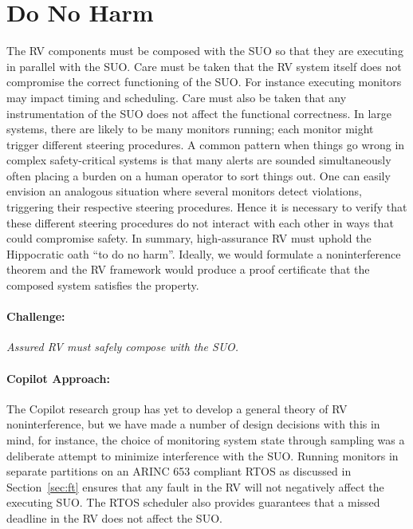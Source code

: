 \section{Do No Harm} \label{sec:noninter} The RV components must be
composed with the SUO so that they are executing in parallel with the
SUO.  Care must be taken that the RV system itself does not compromise
the correct functioning of the SUO.  For instance executing monitors
may impact timing and scheduling. Care must also be taken that any
instrumentation of the SUO does not affect the functional
correctness. In large systems, there are likely to be many monitors
running; each monitor might trigger different steering procedures. A common
pattern when things go wrong in complex safety-critical systems is
that many alerts are sounded simultaneously often placing a burden on
a human operator to sort things out.  One can easily envision an
analogous situation where several monitors detect violations,
triggering their respective steering procedures. Hence it is necessary
to verify that these different steering procedures do not interact with
each other in ways that could compromise safety. In summary,
high-assurance RV must uphold the Hippocratic oath ``to do no harm''.
Ideally, we would formulate a noninterference theorem and the RV
framework would produce a proof certificate that the composed system
satisfies the property.


\paragraph{Challenge:} \emph{Assured RV must safely compose with the
  SUO.}

\paragraph{Copilot Approach:}  
The Copilot research group has yet to develop a general theory of RV 
noninterference, but we have made a number of design decisions with
this in mind, for instance, the choice of monitoring system state
through sampling was a deliberate attempt to minimize interference
with the SUO. Running monitors in separate partitions on an ARINC 653
compliant RTOS as discussed in Section~\ref{sec:ft} ensures that any fault
in the RV will not negatively affect the executing SUO. The RTOS
scheduler also provides guarantees that a missed deadline in the RV
does not affect the SUO.

 

